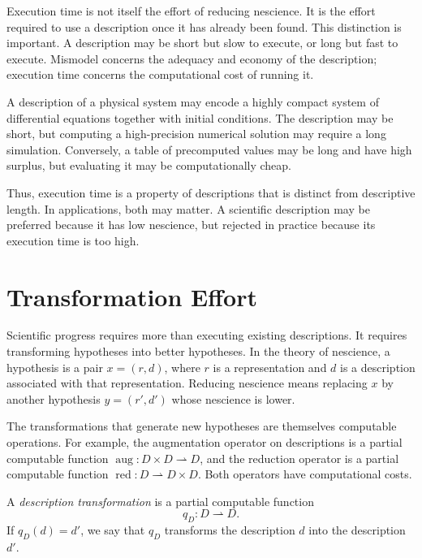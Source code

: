 Execution time is not itself the effort of reducing nescience. It is the effort required to use a description once it has already been found. This distinction is important. A description may be short but slow to execute, or long but fast to execute. Mismodel concerns the adequacy and economy of the description; execution time concerns the computational cost of running it.

\begin{example}
A description of a physical system may encode a highly compact system of differential equations together with initial conditions. The description may be short, but computing a high-precision numerical solution may require a long simulation. Conversely, a table of precomputed values may be long and have high surplus, but evaluating it may be computationally cheap.
\end{example}

Thus, execution time is a property of descriptions that is distinct from descriptive length. In applications, both may matter. A scientific description may be preferred because it has low nescience, but rejected in practice because its execution time is too high.

\section{Transformation Effort}
\label{sec:transformation_effort}

Scientific progress requires more than executing existing descriptions. It requires transforming hypotheses into better hypotheses. In the theory of nescience, a hypothesis is a pair $x=(r,d)$, where \(r\) is a representation and \(d\) is a description associated with that representation. Reducing nescience means replacing \(x\) by another hypothesis $y=(r',d')$ whose nescience is lower.

The transformations that generate new hypotheses are themselves computable operations. For example, the augmentation operator on descriptions is a partial computable function $\operatorname{aug}:D\times D\rightharpoonup D$, and the reduction operator is a partial computable function $\operatorname{red}:D\rightharpoonup D\times D$. Both operators have computational costs.

\begin{definition}
A \emph{description transformation} is a partial computable function
\[
q_D:D\rightharpoonup D.
\]
If \(q_D(d)=d'\), we say that \(q_D\) transforms the description \(d\) into the description \(d'\).
\end{definition}


